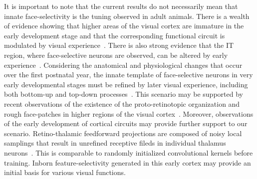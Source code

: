 \documentclass[sn-mathphys]{sn-jnl}%
\theoremstyle{thmstyleone}%
\theoremstyle{thmstyletwo}%
\theoremstyle{thmstylethree}%
\begin{document}
It is important to note that the current results do not necessarily mean that innate face-selectivity is the tuning observed in adult animals.
There is a wealth of evidence showing that higher areas of the visual cortex are immature in the early development stage and that the corresponding functional circuit is modulated by visual experience~\cite{zhang2005delayed,baldwin2012cortical,bourne2006hierarchical,kiorpes2004neural}.
There is also strong evidence that the IT region, where face-selective neurons are observed, can be altered by early experience~\cite{srihasam2012behavioral,srihasam2014novel}.
Considering the anatomical and physiological changes that occur over the first postnatal year, 
the innate template of face-selective neurons in very early developmental stages must be refined by later visual experience, including both bottom-up and top-down processes~\cite{yan2018bottom,epshtein2008image}.
This scenario may be supported by recent observations of the existence of the proto-retinotopic organization and rough face-patches in higher regions of the visual cortex~\cite{livingstone2017development,srihasam2014novel,arcaro2017hierarchical}.
Moreover, observations of the early development of cortical circuits may provide further support to our scenario.
Retino-thalamic feedforward projections are composed of noisy local samplings that result in unrefined receptive fileds in individual thalamus neurons~\cite{tavazoie2000diverse}.
This is comparable to randomly initialized convolutional kernels before training.
Inborn feature-selectivity generated in this early cortex may provide an initial basis for various visual functions.
\end{document}
